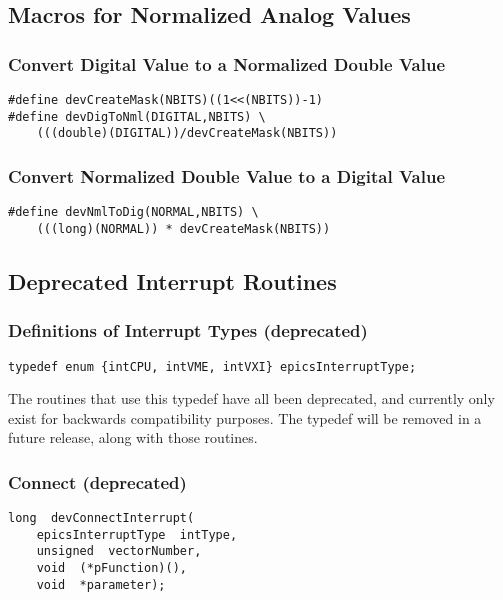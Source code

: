\subsection{Macros for Normalized Analog Values}

\subsubsection{Convert Digital Value to a Normalized Double Value}

\begin{verbatim}
#define devCreateMask(NBITS)((1<<(NBITS))-1)
#define devDigToNml(DIGITAL,NBITS) \
    (((double)(DIGITAL))/devCreateMask(NBITS))
\end{verbatim}

\subsubsection{Convert Normalized Double Value to a Digital Value}

\begin{verbatim}
#define devNmlToDig(NORMAL,NBITS) \
    (((long)(NORMAL)) * devCreateMask(NBITS))
\end{verbatim}

\subsection{Deprecated Interrupt Routines}

\subsubsection{Definitions of Interrupt Types (deprecated)}

\begin{verbatim}
typedef enum {intCPU, intVME, intVXI} epicsInterruptType;
\end{verbatim}

The routines that use this typedef have all been deprecated, and currently only exist for backwards compatibility purposes. 
The typedef will be removed in a future release, along with those routines.

\subsubsection{Connect (deprecated)}

\begin{verbatim}
long  devConnectInterrupt(
    epicsInterruptType  intType,
    unsigned  vectorNumber,
    void  (*pFunction)(),
    void  *parameter);
\end{verbatim}

